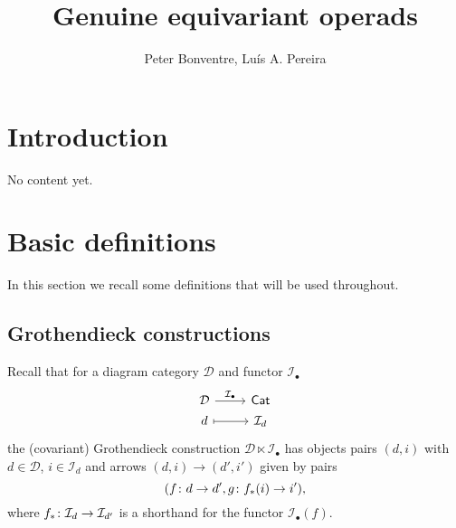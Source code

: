 \documentclass[a4paper,10pt]{article}%
\author{Peter Bonventre, Lu\'is A. Pereira}%
\title{Genuine equivariant operads}%
\begin{document}
	\maketitle%



\tableofcontents

\section{Introduction}

No content yet.



\section{Basic definitions}

In this section we recall some definitions that will be used throughout.


\subsection{Grothendieck constructions}


Recall that for a diagram category $\mathcal{D}$ and functor $\mathcal{I}_{\bullet}$
\begin{equation}
\begin{tikzcd}[row sep = 0.2em]
	\mathcal{D} \ar{r}{\mathcal{I}_{\bullet}} & \mathsf{Cat} \\
	d \ar[mapsto]{r} & \mathcal{I}_d
\end{tikzcd}
\end{equation}
the (covariant) Grothendieck construction 
$\mathcal{D} \ltimes \mathcal{I}_{\bullet}$
has objects pairs $(d,i)$ with $d \in \mathcal{D}$,
 $i \in \mathcal{I}_d$ and 
arrows $(d,i) \to (d',i')$ given by pairs
\[(f\colon d \to d', g \colon f_{\**}(i) \to i'),\]
where $f_{\**}\colon \mathcal{I}_d \to \mathcal{I}_{d'}$ is a shorthand for the functor $\mathcal{I}_{\bullet}(f)$.
\end{document}
